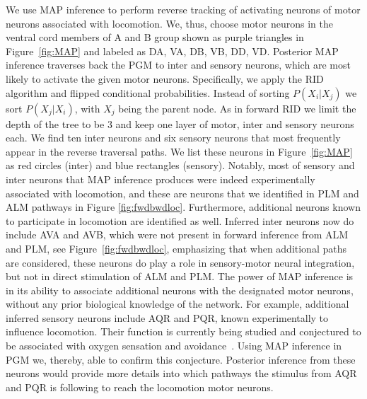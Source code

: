 \documentclass[letterpaper,11pt]{article}
\begin{document}
We use MAP inference to perform reverse tracking of activating neurons of motor neurons associated with locomotion. We, thus, choose motor neurons in the ventral cord members of A and B group shown as purple triangles in Figure~\ref{fig:MAP} and labeled as DA, VA, DB, VB, DD, VD. Posterior MAP inference traverses back the PGM to inter and sensory neurons, which are most likely to activate the given motor neurons. Specifically, we apply the RID algorithm and flipped conditional probabilities. Instead of sorting $P(X_i|X_j)$ we sort $P(X_j|X_i)$, with $X_j$ being the parent node. As in forward RID we limit the  depth of the tree to be 3 and keep one layer of motor, inter and sensory neurons each. We find ten inter neurons and six sensory neurons that most frequently appear in the reverse traversal paths. We list these neurons in Figure~\ref{fig:MAP} as red circles (inter) and blue rectangles (sensory). Notably, most of sensory and inter neurons that MAP inference produces were indeed experimentally associated with locomotion, and these are neurons that we identified in PLM and ALM pathways in Figure \ref{fig:fwdbwdloc}. Furthermore, additional neurons known to participate in locomotion are identified as well. Inferred inter neurons now do include AVA and AVB, which were not present in forward inference from ALM and PLM, see Figure~\ref{fig:fwdbwdloc}, emphasizing that when additional paths are considered, these neurons do play a role in sensory-motor neural integration, but not in direct stimulation of ALM and PLM. The power of MAP inference is in its ability to associate additional neurons with the designated motor neurons, without any prior biological knowledge of the network. For example, additional inferred sensory neurons include AQR and PQR, known experimentally to influence locomotion. Their function is currently being studied and conjectured to be associated with oxygen sensation and avoidance~\cite{chang2006distributed}. Using MAP inference in PGM we, thereby, able to confirm this conjecture. Posterior inference from these neurons would provide more details into which pathways the stimulus from AQR and PQR is following to reach the locomotion motor neurons. 
\end{document}
